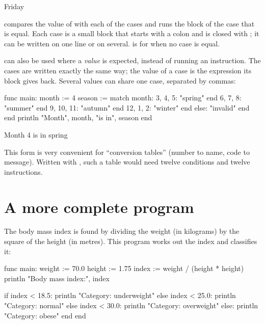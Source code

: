 \begin{salamout}
Friday
\end{salamout}

 compares the value of  with each of the cases and
runs the block of the case that is equal. Each case is a small block that
starts with a colon and is closed with ; it can be written on one
line or on several.  is for when no case is equal.

 can also be used where a \emph{value} is expected, instead of
running an instruction. The cases are written exactly the same way; the value
of a case is the expression its block gives back. Several values can share one
case, separated by commas:

\begin{salamcode}
func main:
    month := 4
    season := match month:
        3, 4, 5: "spring" end
        6, 7, 8: "summer" end
        9, 10, 11: "autumn" end
        12, 1, 2: "winter" end
        else: "invalid" end
    end
    println "Month", month, "is in", season
end
\end{salamcode}

\begin{salamout}
Month 4 is in spring
\end{salamout}

This form is very convenient for ``conversion tables'' (number to name, code
to message). Written with , such a table would need twelve
conditions and twelve  instructions.

\section{A more complete program}

The body mass index is found by dividing the weight (in kilograms) by the
square of the height (in metres). This program works out the index and
classifies it:

\begin{salamcode}
func main:
    weight := 70.0
    height := 1.75
    index := weight / (height * height)
    println "Body mass index:", index

    if index < 18.5:
        println "Category: underweight"
    else index < 25.0:
        println "Category: normal"
    else index < 30.0:
        println "Category: overweight"
    else:
        println "Category: obese"
    end
end
\end{salamcode}

